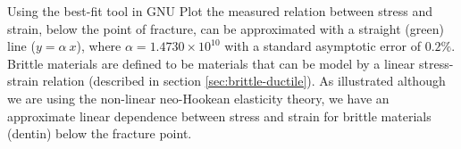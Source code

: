 Using the best-fit tool in GNU Plot the measured relation between
stress and strain, below the point of fracture, can be approximated
with a straight (green) line ($y = \alpha \ x$), where
$\alpha = 1.4730 \times 10^{10}$ with a standard asymptotic error of
$0.2\%$.
%
Brittle materials are defined to be materials that can be
model by a linear stress-strain relation (described in section
\vref{sec:brittle-ductile}).
%
As illustrated although we are using the non-linear neo-Hookean
elasticity theory, we have an approximate linear dependence between
stress and strain for brittle materials (dentin) below the fracture
point.


%
%




